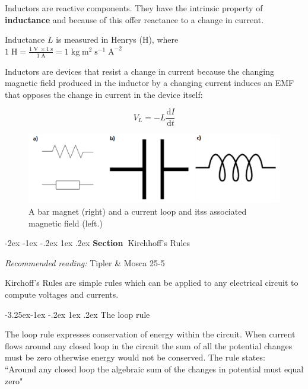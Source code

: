 \documentclass[
]{book}
\makeatletter
\renewcommand\section{%
\@startsection{section}{1}{\z@}%
              {-2ex \@plus -1ex \@minus -.2ex}%
              {1ex \@plus .2ex}%
              {\sffamily\bfseries\large\noindent Section~}}
\renewcommand\subsection{%
\@startsection{subsection}{2}{\z@}%
              {-3.25ex\@plus -1ex \@minus -.2ex}%
              {1ex \@plus .2ex}%
              {\sffamily\bfseries}}
\numberwithin{equation}{section}
\makeatother
\begin{document}
Inductors are reactive components. They have the intrinsic property of
\textbf{inductance} and because of this offer reactance to a change in
current.

Inductance \(L\) is measured in Henrys (H), where\\
\(1 \; \text{H} = \frac{1 \; \text{V} \; \times 1 \; \text{s} } { 1 \; \text{A} } = 1 \; \text{kg} \; \text{m}^{2} \; \text{s}^{-1} \; \text{A}^{-2}\)

Inductors are devices that resist a change in current because the
changing magnetic field produced in the inductor by a changing current
induces an EMF that opposes the change in current in the device itself:

\begin{equation}
\label{eq:Vinductor}
V_L  = -L \frac{\mathrm{d} I}{\mathrm{d} t}
\end{equation}

\begin{figure}

{\centering \includegraphics[width=0.7\linewidth]{Figures/LCR_symbols} 

}

\caption{A bar magnet (right) and a current loop and itss associated magnetic field (left.)}\label{fig:LCRsymbols}
\end{figure}

\hypertarget{kirchhoffs-rules}{%
\section{Kirchhoff's Rules}\label{kirchhoffs-rules}}

\emph{Recommended reading:} Tipler \& Mosca 25-5

Kirchoff's Rules are simple rules which can be applied to any electrical
circuit to compute voltages and currents.

\hypertarget{the-loop-rule}{%
\subsection{The loop rule}\label{the-loop-rule}}

The loop rule expresses conservation of energy within the circuit. When
current flows around any closed loop in the circuit the sum of all the
potential changes must be zero otherwise energy would not be conserved.
The rule states:\\
``Around any closed loop the algebraic sum of the changes in potential
must equal zero"
\end{document}

